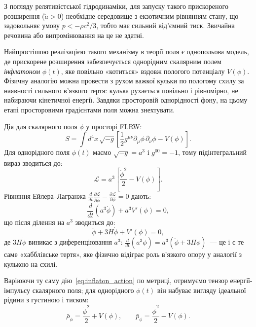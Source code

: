 \documentclass[12pt, a4paper]{article}
\begin{document}
З погляду релятивістської гідродинаміки, для запуску такого прискореного
розширення ($\ddot{a} > 0$) необхідне середовище з екзотичним рівнянням
стану, що задовольняє умову $p < -\rho c^2 / 3$, тобто має сильний
від'ємний тиск. Звичайна речовина або випромінювання на це не здатні.

Найпростішою реалізацією такого механізму в теорії поля є однопольова
модель, де прискорене розширення забезпечується однорідним скалярним
полем \emph{інфлатоном} $\phi(t)$, яке повільно «котиться» вздовж
пологого потенціалу $V(\phi)$. Фізичну аналогію можна провести з
рухом важкої кульки по пологому схилу за наявності сильного
в'язкого тертя: кулька рухається повільно і рівномірно, не
набираючи кінетичної енергії. Завдяки просторовій однорідності
фону, на цьому етапі просторовими градієнтами поля можна знехтувати.

Дія для скалярного поля $\phi$ у просторі FLRW:
\begin{equation}\label{eq:inflaton_action}
  S = \int d^4x\,\sqrt{-g}\left[\frac{1}{2}g^{\mu\nu}\partial_\mu\phi\,\partial_\nu\phi - V(\phi)\right].
\end{equation}
Для однорідного поля $\phi(t)$ маємо $\sqrt{-g} = a^3$ і $g^{00} = -1$,
тому підінтегральний вираз зводиться до:
\begin{equation*}
  \mathcal{L} = a^3\!\left[\frac{\dot{\phi}^2}{2} - V(\phi)\right].
\end{equation*}
Рівняння Ейлера--Лагранжа $\frac{d}{dt}\frac{\partial\mathcal{L}}{\partial\dot{\phi}} - \frac{\partial\mathcal{L}}{\partial\phi} = 0$ дають:
\begin{equation*}
  \frac{d}{dt}\!\left(a^3\dot{\phi}\right) + a^3 V'(\phi) = 0,
\end{equation*}
що після ділення на $a^3$ зводиться до:
\begin{equation}\label{eq:klein_gordon}
    \ddot{\phi} +3H\dot{\phi} + V'(\phi) = 0,
\end{equation}
де $3H\dot{\phi}$ виникає з диференціювання $a^3$:
$\frac{d}{dt}(a^3\dot{\phi}) = a^3(\ddot{\phi} + 3H\dot{\phi})$~---
це і є те саме «хабблівське тертя», яке фізично відіграє роль
в'язкого опору у аналогії з кулькою на схилі.

Варіюючи ту саму дію~\eqref{eq:inflaton_action} по метриці,
отримуємо тензор енергії-імпульсу скалярного поля; для
однорідного $\phi(t)$ він набуває вигляду ідеальної рідини
з густиною і тиском:
\begin{equation}\label{eq:inflaton_rho_p}
  \bar{\rho}_\phi = \frac{\dot{\phi}^2}{2} + V(\phi),
  \qquad
  \bar{p}_\phi   = \frac{\dot{\phi}^2}{2} - V(\phi).
\end{equation}
\end{document}
